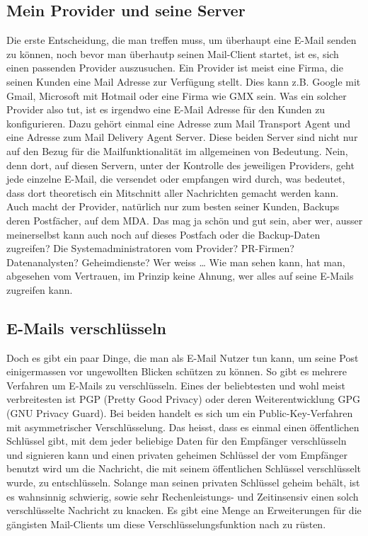 \subsection{Mein Provider und seine Server}
Die erste Entscheidung, die man treffen muss, um überhaupt eine E-Mail senden zu können, noch bevor man überhautp seinen Mail-Client startet, ist es, sich einen passenden Provider auszusuchen. Ein Provider ist meist eine Firma, die seinen Kunden eine Mail Adresse zur Verfügung stellt. Dies kann z.B. Google mit Gmail, Microsoft mit Hotmail oder eine Firma wie GMX sein. Was ein solcher Provider also tut, ist es irgendwo eine E-Mail Adresse für den Kunden zu konfigurieren. Dazu gehört einmal eine Adresse zum Mail Transport Agent und eine Adresse zum Mail Delivery Agent Server.
Diese beiden Server sind nicht nur auf den Bezug für die Mailfunktionalität im allgemeinen von Bedeutung. Nein, denn dort, auf diesen Servern, unter der Kontrolle des jeweiligen Providers, geht jede einzelne E-Mail, die versendet oder empfangen wird durch, was bedeutet, dass dort theoretisch ein Mitschnitt aller Nachrichten gemacht werden kann. Auch macht der Provider, natürlich nur zum besten seiner Kunden, Backups deren Postfächer, auf dem MDA. Das mag ja schön und gut sein, aber wer, ausser meinerselbst kann auch noch auf dieses Postfach oder die Backup-Daten zugreifen? Die Systemadministratoren vom Provider? PR-Firmen? Datenanalysten? Geheimdienste? Wer weiss …
Wie man sehen kann, hat man, abgesehen vom Vertrauen, im Prinzip keine Ahnung, wer alles auf seine E-Mails zugreifen kann.

\subsection{E-Mails verschlüsseln}
Doch es gibt ein paar Dinge, die man als E-Mail Nutzer tun kann, um seine Post einigermassen vor ungewollten Blicken schützen zu können.
So gibt es mehrere Verfahren um E-Mails zu verschlüsseln. Eines der beliebtesten und wohl meist verbreitesten ist PGP (Pretty Good Privacy) oder deren Weiterentwicklung GPG (GNU Privacy Guard).
Bei beiden handelt es sich um ein Public-Key-Verfahren mit asymmetrischer Verschlüsselung. Das heisst, dass es einmal einen öffentlichen Schlüssel gibt, mit dem jeder beliebige Daten für den Empfänger verschlüsseln und signieren kann und einen privaten geheimen Schlüssel der vom Empfänger benutzt wird um die Nachricht, die mit seinem öffentlichen Schlüssel verschlüsselt wurde, zu entschlüsseln.
Solange man seinen privaten Schlüssel geheim behält, ist es wahnsinnig schwierig, sowie sehr Rechenleistungs- und Zeitinsensiv einen solch verschlüsselte Nachricht zu knacken.
Es gibt eine Menge an Erweiterungen für die gängisten Mail-Clients um diese Verschlüsselungsfunktion nach zu rüsten.

